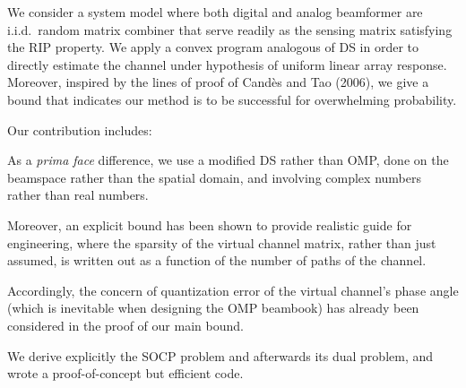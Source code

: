 \startsection [title={Our Contribution}]

We consider a system model where both digital and analog beamformer are i.i.d.\ random matrix combiner that serve readily as the sensing matrix satisfying the RIP property.
We apply a convex program analogous of DS in order to directly estimate the channel under hypothesis of uniform linear array response.
Moreover, inspired by the lines of proof of Cand\`es and Tao (2006), we give a bound that indicates our method is to be successful for overwhelming probability.

Our contribution includes:

\startitemize
\item As a {\it prima face} difference, we use a modified DS rather than OMP, done on the beamspace rather than the spatial domain, and involving complex numbers rather than real numbers.
\item Moreover, an explicit bound has been shown to provide realistic guide for engineering, where the sparsity of the virtual channel matrix, rather than just assumed, is written out as a function of the number of paths of the channel.
\item Accordingly, the concern of quantization error of the virtual channel's phase angle (which is inevitable when designing the OMP beambook) has already been considered in the proof of our main bound.
\item We derive explicitly the SOCP problem and afterwards its dual problem, and wrote a proof-of-concept but efficient code.
\stopitemize

\stopsection

\stopchapter

